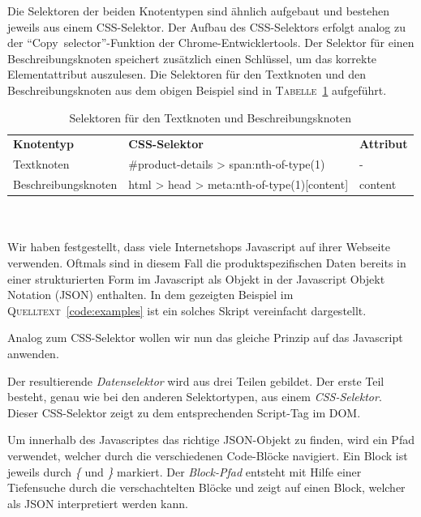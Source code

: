 Die Selektoren der beiden Knotentypen sind ähnlich aufgebaut und bestehen jeweils aus einem CSS-Selektor.
Der Aufbau des CSS-Selektors erfolgt analog zu der ``Copy~selector''-Funktion der Chrome-Entwicklertools.
Der Selektor für einen Beschreibungsknoten speichert zusätzlich einen Schlüssel, um das korrekte Elementattribut
auszulesen.
Die Selektoren für den Textknoten und den Beschreibungsknoten aus dem obigen Beispiel sind in
\textsc{Tabelle}~\ref{tab:textselektor-und-beschreibungsselektor} aufgeführt.
\begin{table}[h]
    \centering
    \begin{tabular}{ l | l | l}
        \textbf{Knotentyp}   &   \textbf{CSS-Selektor}    &   \textbf{Attribut} \\
        Textknoten  &   \#product-details > span:nth-of-type(1) & - \\
        Beschreibungsknoten &   html > head > meta:nth-of-type(1)[content]  & content
    \end{tabular}
        \caption{Selektoren für den  Textknoten und  Beschreibungsknoten}
    \label{tab:textselektor-und-beschreibungsselektor}
    \vspace{-0.5cm}
\end{table}
\\
~\\
Wir haben festgestellt, dass viele Internetshops Javascript auf ihrer Webseite verwenden.
Oftmals sind in diesem Fall die produktspezifischen Daten bereits in einer strukturierten Form im Javascript
als Objekt in der Javascript Objekt Notation (JSON) enthalten.
In dem gezeigten Beispiel im \textsc{Quelltext}~\ref{code:examples} ist ein solches Skript vereinfacht dargestellt.

Analog zum CSS-Selektor wollen wir nun das gleiche Prinzip auf das Javascript anwenden.

Der resultierende \textit{Datenselektor} wird aus drei Teilen gebildet.
Der erste Teil besteht, genau wie bei den anderen Selektortypen, aus einem \textit{CSS-Selektor}.
Dieser CSS-Selektor zeigt zu dem entsprechenden Script-Tag im DOM\@.

Um innerhalb des Javascriptes das richtige JSON-Objekt zu finden, wird ein Pfad verwendet, welcher durch die
verschiedenen Code-Blöcke navigiert.
Ein Block ist jeweils durch \textit{\{} und \textit{\}} markiert.
Der \textit{Block-Pfad} entsteht mit Hilfe einer Tiefensuche durch die verschachtelten Blöcke und zeigt auf einen
Block, welcher als JSON interpretiert werden kann.

